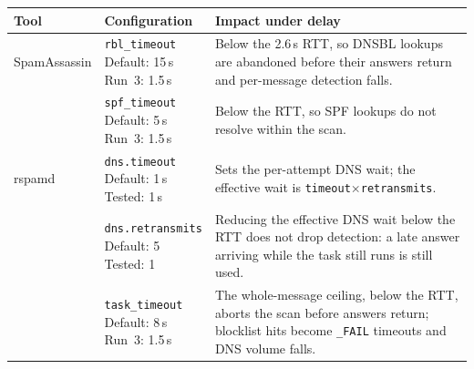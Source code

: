 \begin{table}[H]\centering
\footnotesize
\renewcommand{\arraystretch}{1.4}
\begin{tabular}{@{}p{2.1cm} p{4.4cm} p{5.7cm}@{}}
\toprule
\textbf{Tool} & \textbf{Configuration} & \textbf{Impact under delay} \\
\midrule

SpamAssassin &
\makecell[l]{\texttt{rbl\_timeout}\\
\hspace{1em}Default: 15\,s\\
\hspace{1em}Run~3: 1.5\,s} &
Below the 2.6\,s RTT, so DNSBL lookups are abandoned before their answers return and per-message detection falls. \\
\cmidrule(l){2-3}

&
\makecell[l]{\texttt{spf\_timeout}\\
\hspace{1em}Default: 5\,s\\
\hspace{1em}Run~3: 1.5\,s} &
Below the RTT, so SPF lookups do not resolve within the scan. \\
\midrule

rspamd &
\makecell[l]{\texttt{dns.timeout}\\
\hspace{1em}Default: 1\,s\\
\hspace{1em}Tested: 1\,s} &
Sets the per-attempt DNS wait; the effective wait is
\texttt{timeout}$\times$\texttt{retransmits}. \\
\cmidrule(l){2-3}

&
\makecell[l]{\texttt{dns.retransmits}\\
\hspace{1em}Default: 5\\
\hspace{1em}Tested: 1} &
Reducing the effective DNS wait below the RTT does not drop detection: a late answer arriving while the task still runs is still used. \\
\cmidrule(l){2-3}

&
\makecell[l]{\texttt{task\_timeout}\\
\hspace{1em}Default: 8\,s\\
\hspace{1em}Run~3: 1.5\,s} &
The whole-message ceiling, below the RTT, aborts the scan before answers return; blocklist hits become \texttt{\_FAIL} timeouts and DNS volume falls. \\
\midrule


\end{tabular}
\end{table}
